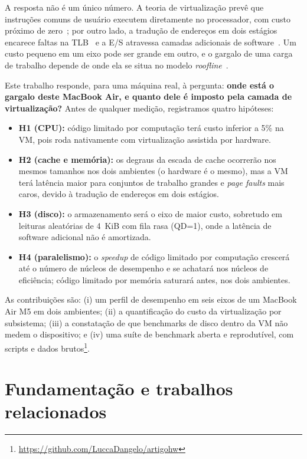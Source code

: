 \documentclass[12pt]{article}
\begin{document}
A resposta não é um único número. A teoria de virtualização prevê que
instruções comuns de usuário executem diretamente no processador, com custo
próximo de zero~\cite{popek1974,adams2006}; por outro lado, a tradução de
endereços em dois estágios encarece faltas na TLB~\cite{bhargava2008} e a E/S
atravessa camadas adicionais de software~\cite{barham2003,felter2015}. Um custo
pequeno em um eixo pode ser grande em outro, e o gargalo de uma carga de
trabalho depende de onde ela se situa no modelo \emph{roofline}~\cite{williams2009}.

Este trabalho responde, para uma máquina real, à pergunta:
\textbf{onde está o gargalo deste MacBook Air, e quanto dele é imposto pela
camada de virtualização?} Antes de qualquer medição, registramos quatro
hipóteses:

\begin{itemize}
  \item \textbf{H1 (CPU):} código limitado por computação terá custo inferior
    a 5\% na VM, pois roda nativamente com virtualização assistida por hardware.
  \item \textbf{H2 (cache e memória):} os degraus da escada de cache ocorrerão
    nos mesmos tamanhos nos dois ambientes (o hardware é o mesmo), mas a VM terá
    latência maior para conjuntos de trabalho grandes e \emph{page faults} mais
    caros, devido à tradução de endereços em dois estágios.
  \item \textbf{H3 (disco):} o armazenamento será o eixo de maior custo,
    sobretudo em leituras aleatórias de 4~KiB com fila rasa (QD=1), onde a
    latência de software adicional não é amortizada.
  \item \textbf{H4 (paralelismo):} o \emph{speedup} de código limitado por
    computação crescerá até o número de núcleos de desempenho e se achatará nos
    núcleos de eficiência; código limitado por memória saturará antes, nos dois
    ambientes.
\end{itemize}

As contribuições são: (i) um perfil de desempenho em seis eixos de um MacBook
Air M5 em dois ambientes; (ii) a quantificação do custo da virtualização por
subsistema; (iii) a constatação de que benchmarks de disco dentro da VM não
medem o dispositivo; e (iv) uma suíte de benchmark aberta e reprodutível, com
scripts e dados brutos\footnote{\url{https://github.com/LuccaDangelo/artigohw}}.

\section{Fundamentação e trabalhos relacionados}
\end{document}
